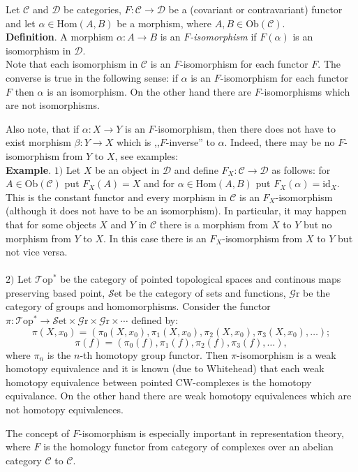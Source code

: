 \documentclass[12pt]{article}
\begin{document}
Let $\mathcal{C}$ and $\mathcal{D}$ be categories, $F:\mathcal{C}\to\mathcal{D}$ be a (covariant or contravariant) functor and let $\alpha\in\mathrm{Hom}(A,B)$ be a morphism, where $A,B\in\mathrm{Ob}(\mathcal{C})$.\\

\textbf{Definition}. A morphism $\alpha:A\to B$ is an $F$\textit{-isomorphism} if $F(\alpha)$ is an isomorphism in $\mathcal{D}$.\\

Note that each isomorphism in $\mathcal{C}$ is an $F$-isomorphism for each functor $F$. The converse is true in the following sense: if $\alpha$ is an $F$-isomorphism for each functor $F$ then $\alpha$ is an isomorphism. On the other hand there are $F$-isomorphisms which are not isomorphisms.

Also note, that if $\alpha:X\to Y$ is an $F$-isomorphism, then there does not have to exist morphism $\beta:Y\to X$ which is ,,$F$-inverse'' to $\alpha$. Indeed, there may be no $F$-isomorphism from $Y$ to $X$, see examples:\\

\textbf{Example}. $1)$ Let $X$ be an object in $\mathcal{D}$ and define $F_{X}:\mathcal{C}\to\mathcal{D}$ as follows: for $A\in\mathrm{Ob}(\mathcal{C})$ put $F_{X}(A)=X$ and for $\alpha\in\mathrm{Hom}(A,B)$ put $F_{X}(\alpha)=\mathrm{id}_{X}$. This is the constant functor and every morphism in $\mathcal{C}$ is an $F_{X}$-isomorphism (although it does not have to be an isomorphism).
\indent In particular, it may happen that for some objects $X$ and $Y$ in $\mathcal{C}$ there is a morphism from $X$ to $Y$ but no morphism from $Y$ to $X$. In this case there is an $F_X$-isomorphism from $X$ to $Y$ but not vice versa.\\ \\
$2)$ Let $\mathcal{T}\mathrm{op}^{*}$ be the category of pointed topological spaces and continous maps preserving based point, $\mathcal{S}\mathrm{et}$ be the category of sets and functions, $\mathcal{G}\mathrm{r}$ be the category of groups and homomorphisms. Consider the functor $\pi:\mathcal{T}\mathrm{op}^{*}\to\mathcal{S}\mathrm{et}\times\mathcal{G}\mathrm{r}\times\mathcal{G}\mathrm{r}\times\cdots$ defined by:
$$\pi(X,x_{0})=(\pi_{0}(X,x_{0}),\pi_{1}(X,x_{0}),\pi_{2}(X,x_{0}),\pi_{3}(X,x_{0}),\ldots);$$
$$\pi(f)=(\pi_{0}(f),\pi_{1}(f),\pi_{2}(f),\pi_{3}(f),\ldots),$$
where $\pi_{n}$ is the $n$-th homotopy group functor. Then $\pi$-isomorphism is a weak homotopy equivalence and it is known (due to Whitehead) that each weak homotopy equivalence between pointed $\mathrm{CW}$-complexes is the homotopy equivalance. On the other hand there are weak homotopy equivalences which are not homotopy equivalences.

The concept of $F$-isomorphism is especially important in representation theory, where $F$ is the homology functor from category of complexes over an abelian category $\mathcal{C}$ to $\mathcal{C}$.
\end{document}
